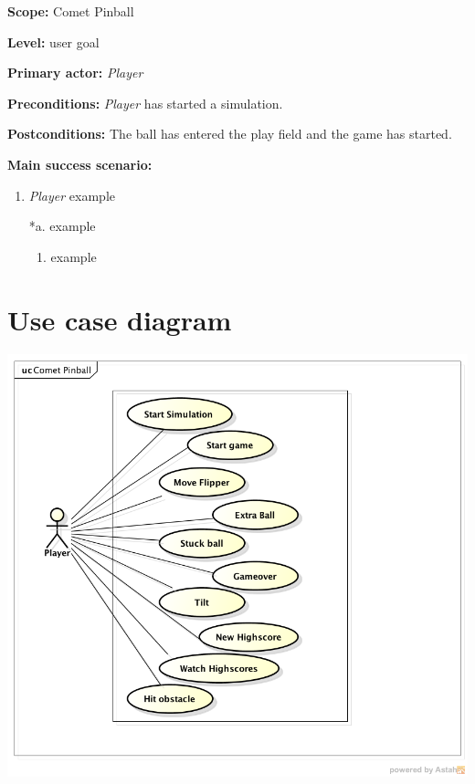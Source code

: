 \documentclass[fontsize=12pt,
               paper=a4,
               twoside=false,
               parskip=half,
               ]{scrartcl}
\begin{document}
\textbf{\textsf{Scope:}} Comet Pinball

\textbf{\textsf{Level:}} user goal

\textbf{\textsf{Primary actor:}} \emph{Player}

\textbf{\textsf{Preconditions:}} \emph{Player} has started a simulation.

\textbf{\textsf{Postconditions:}} The ball has entered the play field and the game has started.

\textbf{\textsf{Main success scenario:}}

\begin{enumerate}[leftmargin=3em]
	\item \emph{Player} example
\end{enumerate}


\begin{itemize}[leftmargin=3em]
	\item[*a.] example
	\begin{enumerate}
		\item example
	\end{enumerate}
\end{itemize}



\section{Use case diagram}


\includegraphics[width=15cm]{./img/usecase-model.png}
\end{document}
